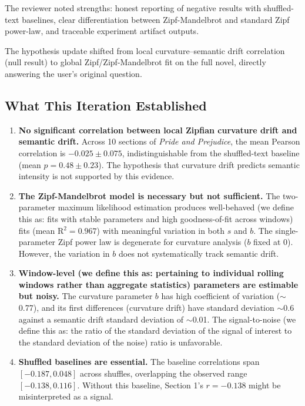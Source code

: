 \documentclass[11pt,letterpaper]{article}
\begin{document}
The reviewer noted strengths: honest reporting of negative results with shuffled-text baselines, clear differentiation between Zipf-Mandelbrot and standard Zipf power-law, and traceable experiment artifact outputs.

The hypothesis update shifted from local curvature--semantic drift correlation (null result) to global Zipf/Zipf-Mandelbrot fit on the full novel, directly answering the user's original question.

\subsection{What This Iteration Established}

\begin{enumerate}
\item \textbf{No significant correlation between local Zipfian curvature drift and semantic drift.} Across 10 sections of \textit{Pride and Prejudice}, the mean Pearson correlation is $-0.025 \pm 0.075$, indistinguishable from the shuffled-text baseline (mean $p = 0.48 \pm 0.23$). The hypothesis that curvature drift predicts semantic intensity is not supported by this evidence.
\item \textbf{The Zipf-Mandelbrot model is necessary but not sufficient.} The two-parameter maximum likelihood estimation produces well-behaved (we define this as: fits with stable parameters and high goodness-of-fit across windows) fits (mean R$^2 = 0.967$) with meaningful variation in both $s$ and $b$. The single-parameter Zipf power law is degenerate for curvature analysis ($b$ fixed at 0). However, the variation in $b$ does not systematically track semantic drift.
\item \textbf{Window-level (we define this as: pertaining to individual rolling windows rather than aggregate statistics) parameters are estimable but noisy.} The curvature parameter $b$ has high coefficient of variation ($\sim$0.77), and its first differences (curvature drift) have standard deviation $\sim$0.6 against a semantic drift standard deviation of $\sim$0.01. The signal-to-noise (we define this as: the ratio of the standard deviation of the signal of interest to the standard deviation of the noise) ratio is unfavorable.
\item \textbf{Shuffled baselines are essential.} The baseline correlations span $[-0.187, 0.048]$ across shuffles, overlapping the observed range $[-0.138, 0.116]$. Without this baseline, Section 1's $r = -0.138$ might be misinterpreted as a signal.
\end{enumerate}
\end{document}
